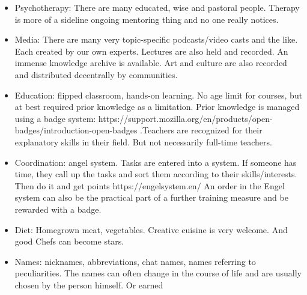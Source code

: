 \begin{itemize}
    \item Psychotherapy: There are many educated, wise and pastoral people. Therapy is more of a sideline ongoing mentoring thing and no one really notices.
    \item Media: There are many very topic-specific podcasts/video casts and the like. Each created by our own experts. Lectures are also held and recorded. An immense knowledge archive is available. Art and culture are also recorded and distributed decentrally by communities.
    \item Education: flipped classroom, hands-on learning. No age limit for courses, but at best required prior knowledge as a limitation. Prior knowledge is managed using a badge system: https://support.mozilla.org/en/products/open-badges/introduction-open-badges .Teachers are recognized for their explanatory skills in their field. But not necessarily full-time teachers.
    \item Coordination: angel system. Tasks are entered into a system. If someone has time, they call up the tasks and sort them according to their skills/interests. Then do it and get points https://engelsystem.en/ An order in the Engel system can also be the practical part of a further training measure and be rewarded with a badge.
    \item Diet: Homegrown meat, vegetables. Creative cuisine is very welcome. And good Chefs can become stars.
    \item Names: nicknames, abbreviations, chat names, names referring to peculiarities. The names can often change in the course of life and are usually chosen by the person himself. Or earned
\end{itemize}

